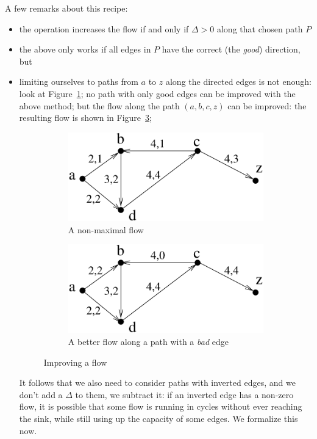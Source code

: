 A few remarks about this recipe:
\begin{itemize}
\item the operation increases the flow if and only if $\Delta > 0$
along that chosen path $P$
\item the above only works if all edges in $P$ have the correct (the
{\em good}) direction, but
\item limiting ourselves to paths from $a$ to $z$ along the directed
edges is not enough: look at Figure~\ref{transport4}; no path with
only good edges can be improved with the above method; but the flow
along the path $(a,b,c,z)$ can be improved: the resulting flow is
shown in Figure~\ref{transport5};

\begin{figure}[ht]
	\centering
	\begin{subfigure}{0.35\linewidth}
		\centering
		\includegraphics[width=\linewidth,keepaspectratio]{transport4}
		\caption{A non-maximal flow}
		\label{transport4}
	\end{subfigure}\qquad\quad
	\begin{subfigure}{0.35\linewidth}
		\centering
		\includegraphics[width=\linewidth,keepaspectratio]{transport5}
		\caption{A better flow along a path with a {\em bad} edge}
		\label{transport5}
	\end{subfigure}
	\caption{Improving a flow}
\end{figure}

It follows that we also need to consider paths with inverted edges,
and we don't add a $\Delta$ to them, we subtract it: if an inverted
edge has a non-zero flow, it is possible that some flow is running in
cycles without ever reaching the sink, while still using up the
capacity of some edges. We formalize this now.

\end{itemize}

